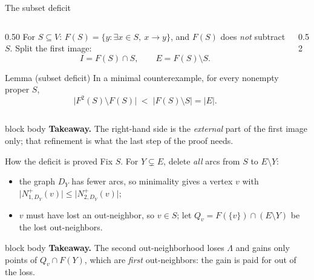 \documentclass[aspectratio=169,11pt]{beamer}
\newcommand{\abs}[1]{\lvert #1\rvert}
\newcommand{\takeaway}[1]{%
  \vfill
  \begin{beamercolorbox}[wd=\dimexpr\textwidth-9pt\relax,sep=4pt,rounded=true]{block body}
    \footnotesize\color{mainblue}\textbf{Takeaway.} \color{black}#1
  \end{beamercolorbox}}
\begin{document}
\begin{frame}{The subset deficit}
  \small
  \begin{columns}[T]
  \begin{column}{0.50\textwidth}
    For $S\subseteq V$: $F(S)=\{y:\exists x\in S,\ x\to y\}$, and $F(S)$ does \emph{not} subtract
    $S$. Split the first image:
    \[ I=F(S)\cap S,\qquad E=F(S)\setminus S . \]
    \begin{block}{Lemma (subset deficit)}
      In a minimal counterexample, for every nonempty proper $S$,
      \[ \abs{F^2(S)\setminus F(S)}\;<\;\abs{F(S)\setminus S}=\abs E . \]
    \end{block}
  \end{column}
  \begin{column}{0.52\textwidth}
    \centering
    \scalebox{0.56}{}
  \end{column}
  \end{columns}
  \takeaway{The right-hand side is the \emph{external} part of the first image only; that
  refinement is what the last step of the proof needs.}
\end{frame}

\begin{frame}{How the deficit is proved}
  \small
  Fix $S$. For $Y\subsetneq E$, delete \emph{all} arcs from $S$ to $E\setminus Y$:
  \begin{itemize}
    \item the graph $D_Y$ has fewer arcs, so minimality gives a vertex $v$ with
      $\abs{N_{1,D_Y}^+(v)}\le\abs{N_{2,D_Y}^+(v)}$;
    \item $v$ must have lost an out-neighbor, so $v\in S$; let
      $Q_v=F(\{v\})\cap(E\setminus Y)$ be the lost out-neighbors.
  \end{itemize}
  \medskip
  \centering
  \scalebox{0.60}{}
  \takeaway{The second out-neighborhood loses $\Lambda$ and gains only points of $Q_v\cap F(Y)$,
  which are \emph{first} out-neighbors: the gain is paid for out of the loss.}
\end{frame}
\end{document}
